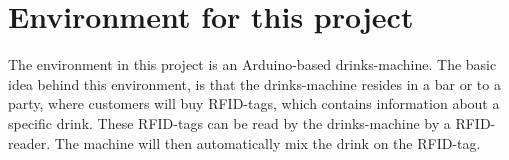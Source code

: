 \section{Environment for this project}
The environment in this project is an Arduino-based drinks-machine. The basic idea behind this environment, is that the drinks-machine resides in a bar or to a party, where customers will buy RFID-tags, which contains information about a specific drink. These RFID-tags can be read by the drinks-machine by a RFID-reader. The machine will then automatically mix the drink on the RFID-tag.